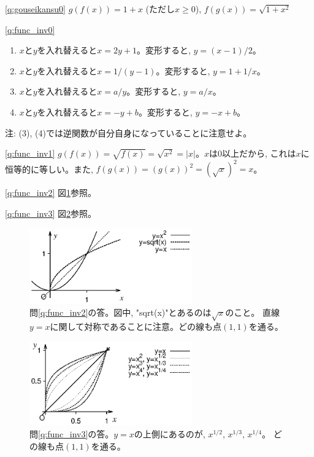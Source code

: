 \ref{q:gouseikansu0}
$g(f(x))=1+x$ (ただし$x\ge0$), $f(g(x))=\sqrt{1+x^2}$\mv

\ref{q:func_inv0} 
\begin{enumerate}
\item $x$と$y$を入れ替えると$x=2y+1$。変形すると, $y=(x-1)/2$。
\item $x$と$y$を入れ替えると$x=1/(y-1)$。変形すると, $y=1+1/x$。
\item $x$と$y$を入れ替えると$x=a/y$。変形すると, $y=a/x$。
\item $x$と$y$を入れ替えると$x=-y+b$。変形すると, $y=-x+b$。
\end{enumerate}
注: (3), (4)では逆関数が自分自身になっていることに注意せよ。\mv

\ref{q:func_inv1} $g(f(x))=\sqrt{f(x)}=\sqrt{x^2}=|x|$。$x$は0以上だから, これは$x$に恒等的に等しい。また, 
$f(g(x))=(g(x))^2=(\sqrt{x})^2=x$。
\mv

\ref{q:func_inv2} 図\ref{xx_and_sqrt_x}参照。
\mv

\ref{q:func_inv3} 図\ref{x_or_xx_etc}参照。
\mv

\begin{figure}[h]
    \centering
      \includegraphics[width=7cm]{xx_and_sqrt_x.eps}
      \caption{問\ref{q:func_inv2}の答。図中, "sqrt(x)"とあるのは$\sqrt{x}$のこと。
直線$y=x$に関して対称であることに注意。どの線も点$(1, 1)$を通る。\label{xx_and_sqrt_x}}
\end{figure}

\begin{figure}[h]
    \centering
      \includegraphics[width=7cm]{x_or_xx_etc.eps}
      \caption{問\ref{q:func_inv3}の答。$y=x$の上側にあるのが, $x^{1/2},\, x^{1/3},\, x^{1/4}$。
どの線も点$(1, 1)$を通る。\label{x_or_xx_etc}}
\end{figure}

